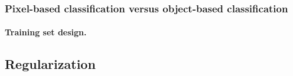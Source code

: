 \subsubsection{Pixel-based classification versus object-based classification}






\paragraph{Training set design. \\}




\subsection{Regularization}

\stopcontents[chapters]